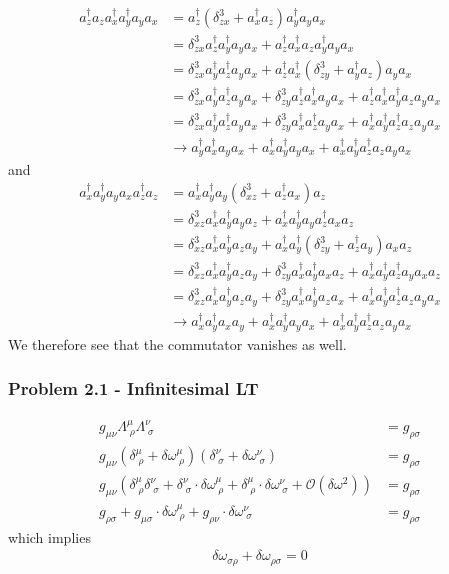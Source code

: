 \documentclass[10pt,a4paper]{article}
\theoremstyle{definition}
\begin{document}
\begin{align}
a^\dagger_za_za^\dagger_xa^\dagger_ya_ya_x
&=a^\dagger_z(\delta^3_{zx}+a^\dagger_xa_z)a^\dagger_ya_ya_x\\
&=\delta^3_{zx}a^\dagger_za^\dagger_ya_ya_x+a^\dagger_za^\dagger_xa_za^\dagger_ya_ya_x\\
&=\delta^3_{zx}a^\dagger_ya^\dagger_za_ya_x+a^\dagger_za^\dagger_x(\delta^3_{zy}+a^\dagger_ya_z)a_ya_x\\
&=\delta^3_{zx}a^\dagger_ya^\dagger_za_ya_x+\delta^3_{zy}a^\dagger_za^\dagger_xa_ya_x+a^\dagger_za^\dagger_xa^\dagger_ya_za_ya_x\\
&=\delta^3_{zx}a^\dagger_ya^\dagger_za_ya_x+\delta^3_{zy}a^\dagger_xa^\dagger_za_ya_x+a^\dagger_xa^\dagger_ya^\dagger_za_za_ya_x\\
&\rightarrow a^\dagger_ya^\dagger_xa_ya_x+a^\dagger_xa^\dagger_ya_ya_x+a^\dagger_xa^\dagger_ya^\dagger_za_za_ya_x
\end{align}
and
\begin{align}
a^\dagger_xa^\dagger_ya_ya_xa^\dagger_za_z
&=a^\dagger_xa^\dagger_ya_y(\delta^3_{xz}+a^\dagger_za_x)a_z\\
&=\delta^3_{xz}a^\dagger_xa^\dagger_ya_ya_z+a^\dagger_xa^\dagger_ya_ya^\dagger_za_xa_z\\
&=\delta^3_{xz}a^\dagger_xa^\dagger_ya_za_y+a^\dagger_xa^\dagger_y(\delta^3_{zy}+a^\dagger_za_y)a_xa_z\\
&=\delta^3_{xz}a^\dagger_xa^\dagger_ya_za_y+\delta^3_{zy}a^\dagger_xa^\dagger_ya_xa_z+a^\dagger_xa^\dagger_ya^\dagger_za_ya_xa_z\\
&=\delta^3_{xz}a^\dagger_xa^\dagger_ya_za_y+\delta^3_{zy}a^\dagger_xa^\dagger_ya_za_x+a^\dagger_xa^\dagger_ya^\dagger_za_za_ya_x\\
&\rightarrow a^\dagger_xa^\dagger_ya_xa_y+a^\dagger_xa^\dagger_ya_ya_x+a^\dagger_xa^\dagger_ya^\dagger_za_za_ya_x
\end{align}
We therefore see that the commutator vanishes as well.

\subsubsection{Problem 2.1 - Infinitesimal LT}
\begin{align}
g_{\mu\nu}\Lambda^\mu_{\;\rho}\Lambda^\nu_{\;\sigma}&=g_{\rho\sigma}\\
g_{\mu\nu}\left(\delta^\mu_{\;\rho}+\delta\omega^\mu_{\;\rho}\right)\left(\delta^\nu_{\;\sigma}+\delta\omega^\nu_{\;\sigma}\right)&=g_{\rho\sigma}\\
g_{\mu\nu}\left(\delta^\mu_{\;\rho}\delta^\nu_{\;\sigma}+\delta^\nu_{\;\sigma}\cdot\delta\omega^\mu_{\;\rho}+\delta^\mu_{\;\rho}\cdot\delta\omega^\nu_{\;\sigma}+\mathcal{O}(\delta\omega^2)\right)&=g_{\rho\sigma}\\
g_{\rho\sigma}+g_{\mu\sigma}\cdot\delta\omega^\mu_{\;\rho}+g_{\rho\nu}\cdot\delta\omega^\nu_{\;\sigma}&=g_{\rho\sigma}
\end{align}
which implies
\begin{align}
\delta\omega_{\sigma\rho}+\delta\omega_{\rho\sigma}=0
\end{align}
\end{document}
